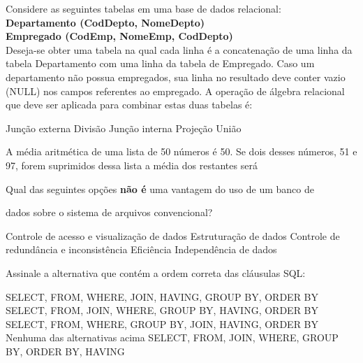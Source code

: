 \documentclass[12pt, addpoints]{exam}
\begin{document}
    \begin{questions}

    \newpage
    \question

Considere as seguintes tabelas em uma base de dados relacional:\\

\textbf{Departamento (CodDepto, NomeDepto)}\\

\textbf{Empregado (CodEmp, NomeEmp, CodDepto)}\\

Deseja-se obter uma tabela na qual cada linha é a concatenação de uma linha da tabela Departamento com uma linha da tabela de Empregado. Caso um departamento não possua empregados, sua linha no resultado deve conter vazio (NULL) nos campos referentes ao empregado. A operação de álgebra relacional que deve ser aplicada para combinar estas duas tabelas é:
\begin{choices}
\choice Junção externa
\choice Divisão
\choice Junção interna
\choice Projeção
\choice União
\end{choices}

\question

A média aritmética de uma lista de 50 números é 50. Se dois desses números, 51 e 97, forem suprimidos dessa lista a média dos restantes será


\begin{choices}
\end{choices}

\question

Qual das seguintes opções \textbf{não é} uma vantagem do uso de um banco de

dados sobre o sistema de arquivos convencional?


\begin{choices}
\choice Controle de acesso e visualização de dados
\choice Estruturação de dados
\choice Controle de redundância e inconsistência
\choice Eficiência
\choice Independência de dados
\end{choices}

\question

Assinale a alternativa que contém a ordem correta das cláusulas SQL:


\begin{choices}
\choice SELECT, FROM, WHERE, JOIN, HAVING, GROUP BY, ORDER BY
\choice SELECT, FROM, JOIN, WHERE, GROUP BY, HAVING, ORDER BY
\choice SELECT, FROM, WHERE, GROUP BY, JOIN, HAVING, ORDER BY
\choice Nenhuma das alternativas acima
\choice SELECT, FROM, JOIN, WHERE, GROUP BY, ORDER BY, HAVING
\end{choices}


\end{questions}
\end{document}
